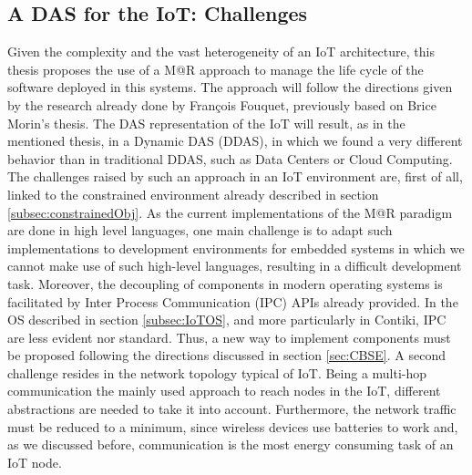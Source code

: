 \subsection{A DAS for the IoT: Challenges}
Given the complexity and the vast heterogeneity of an IoT architecture, this thesis proposes the use of a M@R approach to manage the life cycle of the software deployed in this systems.
The approach will follow the directions given by the research already done by Fran{\c{c}}ois Fouquet\cite{fouquet2013kevoree}, previously based on Brice Morin's thesis\cite{morin2010leveraging}.
The DAS representation of the IoT will result, as in the mentioned thesis, in a Dynamic DAS (DDAS), in which we found a very different behavior than in traditional DDAS, such as Data Centers or Cloud Computing.
The challenges raised by such an approach in an IoT environment are, first of all, linked to the constrained environment already described in section \ref{subsec:constrainedObj}.
As the current implementations of the M@R paradigm are done in high level languages, one main challenge is to adapt such implementations to development environments for embedded systems in which we cannot make use of such high-level languages, resulting in a difficult development task.
Moreover, the decoupling of components in modern operating systems is facilitated by Inter Process Communication (IPC) APIs already provided.
In the OS described in section \ref{subsec:IoTOS}, and more particularly in Contiki, IPC are less evident nor standard.
Thus, a new way to implement components must be proposed following the directions discussed in section \ref{sec:CBSE}.
A second challenge resides in the network topology typical of IoT.
Being a multi-hop communication the mainly used approach to reach nodes in the IoT, different abstractions are needed to take it into account.
Furthermore, the network traffic must be reduced to a minimum, since wireless devices use batteries to work and, as we discussed before, communication is the most energy consuming task of an IoT node.

